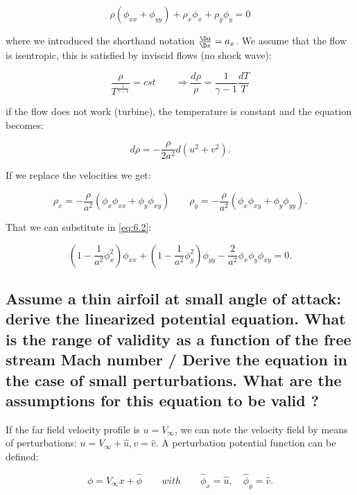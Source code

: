 \documentclass[british,french,11pt, a4paper, openany]{article}
\begin{document}
\begin{equation}
\rho (\phi _{xx} + \phi _{yy}) + \rho _x \phi _x + \rho _y \phi _y = 0
\label{eq:6.2}
\end{equation}

where we introduced the shorthand notation $\frac{\D a}{\D x} = a_x$. We assume that the flow is isentropic, this is satisfied by inviscid flows (no shock  wave): 

\begin{equation}
\frac{\rho}{T^{\frac{1}{\gamma -1}}} = cst \qquad \Rightarrow \frac{d \rho}{\rho} = \frac{1}{\gamma -1} \frac{dT}{T}
\end{equation}

if the flow does not work (turbine), the temperature is constant and the equation becomes:

\begin{equation}
d\rho = -\frac{\rho}{2a^2} d(u^2+v^2).
\end{equation}

If we replace the velocities we get: 

\begin{equation}
\rho _x = -\frac{\rho}{a^2} (\phi _x \phi _{xx} + \phi _y \phi _{xy}) \qquad \rho _y = -\frac{\rho}{a^2} (\phi _x \phi _{xy} + \phi _y \phi _{yy}).
\end{equation}		

That we can substitute in \eqref{eq:6.2}:

\begin{equation}
\left( 1-\frac{1}{a^2} \phi^2_x \right) \phi _{xx} + \left( 1-\frac{1}{a^2 }\phi^2_y \right) \phi _{yy} - \frac{2}{a^2} \phi_x \phi_y \phi _{xy} = 0.
\label{eq:6.6}
\end{equation}	


\subsection{Assume a thin airfoil at small angle of attack: derive the linearized potential equation. What is the range of validity as a function of the free stream Mach number / Derive the equation in the case of small perturbations. What are the assumptions for this equation to be valid ?}

If the far field velocity profile is $u= V_\infty$, we can note the velocity field by means of perturbations: $u = V_\infty + \hat{u}, v = \hat{v}$. A perturbation potential function can be defined: 

\begin{equation}
\phi = V_\infty x + \hat{\phi}\qquad with \qquad \hat{\phi} _x = \hat{u}, \quad \hat{\phi}_y = \hat{v}. 
\end{equation}
\end{document}
